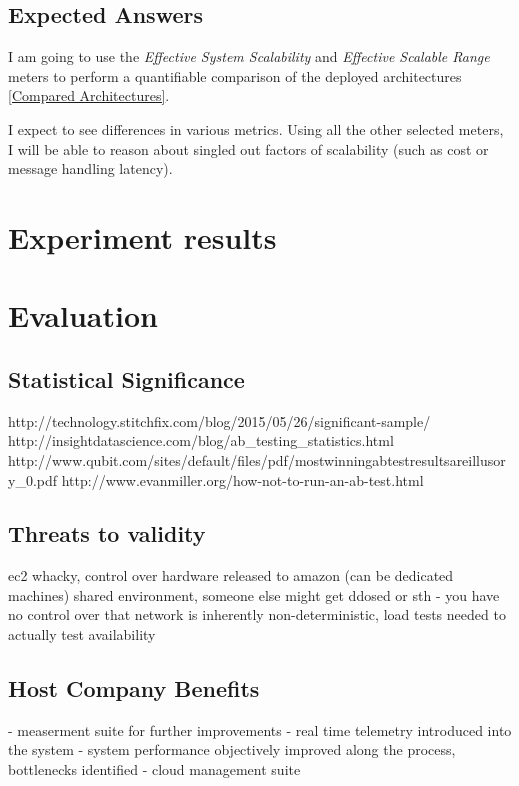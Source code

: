 \documentclass{uvamscse}
\begin{document}
\section{Expected Answers}\label{Expected Answers}
I am going to use the \textit{Effective System Scalability} and \textit{Effective Scalable Range} meters to perform a quantifiable comparison of the deployed architectures \ref{Compared Architectures}.

I expect to see differences in various metrics. Using all the other selected meters, I will be able to reason about singled out factors of scalability (such as cost or message handling latency).



\chapter{Experiment results}\label{Experiment results}


\chapter{Evaluation}\label{Evaluation}

\section{Statistical Significance}
http://technology.stitchfix.com/blog/2015/05/26/significant-sample/
http://insightdatascience.com/blog/ab\_testing\_statistics.html
http://www.qubit.com/sites/default/files/pdf/mostwinningabtestresultsareillusory\_0.pdf
http://www.evanmiller.org/how-not-to-run-an-ab-test.html


\section{Threats to validity}
ec2 whacky, control over hardware released to amazon (can be dedicated machines)
shared environment, someone else might get ddosed or sth - you have no control over that
network is inherently non-deterministic, load tests needed to actually test availability

\section{Host Company Benefits}
- measerment suite for further improvements
- real time telemetry introduced into the system
- system performance objectively improved along the process, bottlenecks identified
- cloud management suite
\end{document}
